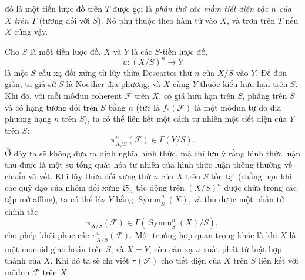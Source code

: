 đó là một tiền lược đồ trên $T$ được gọi là \emph{phân thớ các mầm tiết diện
bậc $n$ của $X$ trên $T$} (tương đối với $S$). Nó phụ thuộc theo hàm tử vào
$X$, và trơn trên $T$ nếu $X$ cũng vậy.


Cho $S$ là một tiền lược đồ, $X$ và $Y$ là các $S$-tiền lược đồ,
\[
u:(X/S)^n\longrightarrow Y
\]
là một $S$-cấu xạ đối xứng từ lũy thừa Descartes thứ $n$ của $X/S$ vào $Y$.
Để đơn giản, ta giả sử $S$ là Noether địa phương, và $X$ cùng $Y$ thuộc kiểu
hữu hạn trên $S$. Khi đó, với mỗi môđun coherent $\mathcal F$ trên $X$, có giá
hữu hạn trên $S$, phẳng trên $S$ và có hạng tương đối trên $S$ bằng $n$ (tức
là $f_*(\mathcal F)$ là một môđun tự do địa phương hạng $n$ trên $S$), ta có
thể liên kết một cách tự nhiên một tiết diện của $Y$ trên $S$:
\[
\pi^u_{X/S}(\mathcal F)\in\Gamma(Y/S).
\]
Ở đây ta sẽ không đưa ra định nghĩa hình thức, mà chỉ lưu ý rằng hình thức
luận thu được là một sự tổng quát hóa tự nhiên của hình thức luận thông thường
về chuẩn và vết. Khi lũy thừa đối xứng thứ $n$ của $X$ trên $S$ tồn tại (chẳng
hạn khi các quỹ đạo của nhóm đối xứng $\mathfrak S_n$ tác động trên $(X/S)^n$
được chứa trong các tập mở affine), ta có thể lấy
$Y$ bằng $\operatorname{Symm}^n_S(X)$, và thu được một phần tử chính tắc
\[
\pi_{X/S}(\mathcal F)\in\Gamma(\operatorname{Symm}^n_S(X)/S),
\]
cho phép khôi phục các $\pi^u_{X/S}(\mathcal F)$. Một trường hợp quan trọng
khác là khi $X$ là một monoid giao hoán trên $S$, và $X=Y$, còn cấu xạ $u$
xuất phát từ luật hợp thành của $X$. Khi đó ta sẽ chỉ viết $\pi(\mathcal F)$
cho tiết diện của $X$ trên $S$ liên kết với môđun $\mathcal F$ trên $X$.

